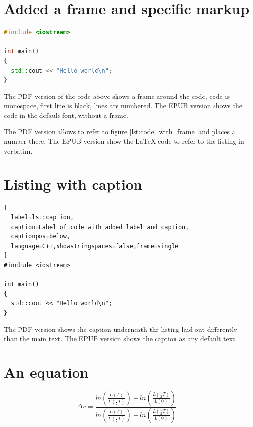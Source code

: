 \documentclass[ebook]{memoir}
\begin{document}
\section{Added a frame and specific markup}

\begin{lstlisting}[language=C++,showstringspaces=false,frame=single,label=lst:code_with_frame]
#include <iostream>

int main()
{
  std::cout << "Hello world\n";
}
\end{lstlisting}

The PDF version of the code above shows a frame around the code, code is monospace, first line is black, lines are numbered.
The EPUB version shows the code in the default font, without a frame.

The PDF version allows to refer to figure \ref{lst:code_with_frame} and places a number there.
The EPUB version show the LaTeX code to refer to the listing in verbatim.

\section{Listing with caption}

\begin{lstlisting}[
  label=lst:caption,
  caption=Label of code with added label and caption,
  captionpos=below,
  language=C++,showstringspaces=false,frame=single
]
#include <iostream>

int main()
{
  std::cout << "Hello world\n";
}
\end{lstlisting}

The PDF version shows the caption underneath the listing laid out differently than the main text.
The EPUB version shows the caption as any default text.

\section{An equation}

\begin{equation}
  \Delta r=\frac{ln\left(\frac{L(T)}{L(\frac{1}{2}T)}\right)-ln\left(\frac{L(\frac{1}{2}T)}{L(0)}\right)}{ln\left(\frac{L(T)}{L(\frac{1}{2}T)}\right)+ln\left(\frac{L(\frac{1}{2}T)}{L(0)}\right)}
  \label{eq:delta_r}
\end{equation}
\end{document}
